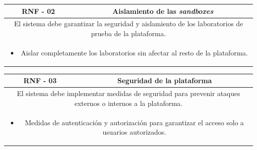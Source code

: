             \begin{table}[!htbp]
                \centering
                \begin{tabular}{|c|c|}
                    \hline
                    \textbf{RNF - 02} & \textbf{Aislamiento de las \textit{sandboxes}} \\
                    \hline
                    \multicolumn{2}{|p{15cm}|}{
                        El sistema debe garantizar la seguridad y aislamiento de los laboratorios de prueba de la plataforma.
                    } \\
                    \hline
                    \multicolumn{2}{|p{15cm}|}{
                        \begin{itemize}
                            \item Aislar completamente los laboratorios sin afectar al resto de la plataforma.
                        \end{itemize}
                        } \\
                    \hline
                \end{tabular}
                \label{tab:RNF2}
            \end{table}
            
            \begin{table}[!htbp]
                \centering
                \begin{tabular}{|c|c|}
                    \hline
                    \textbf{RNF - 03} & \textbf{Seguridad de la plataforma} \\
                    \hline
                    \multicolumn{2}{|p{15cm}|}{
                        El sistema debe implementar medidas de seguridad para prevenir ataques externos o internos a la plataforma.
                    } \\
                    \hline
                    \multicolumn{2}{|p{15cm}|}{
                        \begin{itemize}
                            \item Medidas de autenticación y autorización para garantizar el acceso solo a usuarios autorizados.
                        \end{itemize}
                        } \\
                    \hline
                \end{tabular}
                \label{tab:RNF3}
            \end{table}
            
